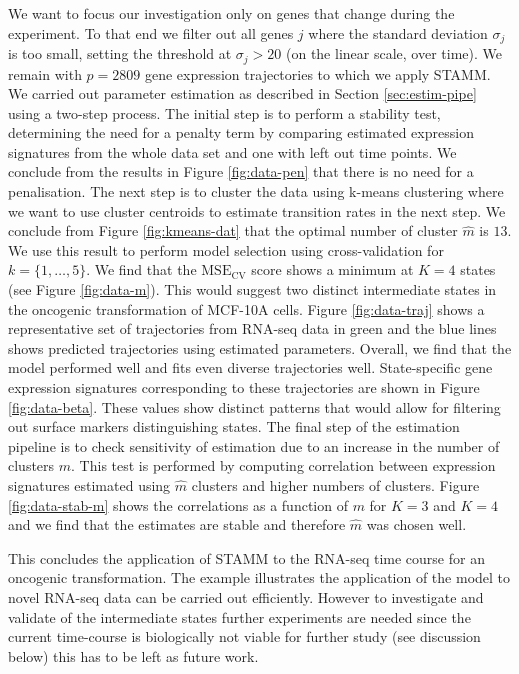 We want to focus our investigation only on genes that change during the experiment. To that end we filter out all genes $j$ where the standard deviation $\sigma_j$ is too small, setting the threshold at $\sigma_j > 20$ (on the linear scale, over time). We remain with $p=2809$ gene expression trajectories to which we apply STAMM. We carried out parameter estimation as described in Section \ref{sec:estim-pipe} using a two-step process. The initial step is to perform a stability test, determining the need for a penalty term by comparing estimated expression signatures from the whole data set and one with left out time points. We conclude from the results in Figure \ref{fig:data-pen} that there is no need for a penalisation. The next step is to cluster the data using k-means clustering where we want to use cluster centroids to estimate transition rates in the next step. We conclude from Figure \ref{fig:kmeans-dat} that the optimal number of cluster  $\hat{m}$ is $13$. We use this result to perform model selection using cross-validation for $k=\lbrace 1, \ldots, 5\rbrace$. We find that the $\mathrm{MSE_{CV}}$ score shows a minimum at $K=4$ states (see Figure \ref{fig:data-m}). This would suggest two distinct intermediate states in the oncogenic transformation of MCF-10A cells. Figure \ref{fig:data-traj} shows a representative set of trajectories from RNA-seq data in green and the blue lines shows predicted trajectories using estimated parameters. Overall, we find that the model performed well and fits even diverse trajectories well. State-specific gene expression signatures corresponding to these trajectories are shown in Figure \ref{fig:data-beta}. These values show distinct patterns that would allow for filtering out surface markers distinguishing states. The final step of the estimation pipeline is to check sensitivity of estimation due to an increase in the number of clusters $m$. This test is performed by computing correlation between expression signatures estimated using $\hat{m}$ clusters and higher numbers of clusters. Figure \ref{fig:data-stab-m} shows the correlations as a function of $m$ for $K=3$ and $K=4$ and we find that the estimates are stable and therefore $\hat{m}$ was chosen well.

This concludes the application of STAMM to the RNA-seq time course for an oncogenic transformation. The example illustrates the application of the model to novel RNA-seq data can be carried out efficiently. However to investigate and validate of the intermediate states further experiments are needed since the current time-course is biologically not viable for further study (see discussion below) this has to be left as future work.

